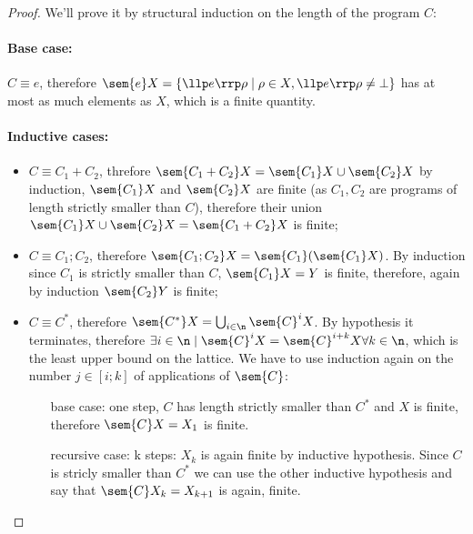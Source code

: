 \begin{proof}
  We'll prove it by structural induction on the length of the
  program \(C\):
  \paragraph*{Base case: \\}
  \(C \equiv e\), therefore \(\sem{e} X = \{\llp e \rrp \rho \mid \rho
  \in X , \llp e \rrp \rho \neq \bot\}\) has at most as much elements
  as \(X\), which is a finite quantity.
  \paragraph*{Inductive cases: \\}
  \begin{itemize}
  \item \(C \equiv C_1 + C_2\), threfore \(\sem{C_1 +C_2}X =
    \sem{C_1}X \cup \sem{C_2}X\) by induction, \(\sem{C_1}X\) and
    \(\sem{C_2}X\) are finite (as \(C_1, C_2\) are programs of length
    strictly smaller than \(C\)), therefore their union \(\sem{C_1}X
    \cup \sem{C_2}X = \sem{C_1 +C_2}X\) is finite;
  \item \(C \equiv C_1; C_2\), therefore \(\sem{C_1;C_2}X =
    \sem{C_1}(\sem{C_1}X)\). By induction since \(C_1\) is strictly
    smaller than \(C\), \(\sem{C_1}X = Y\) is finite, therefore, again
    by induction \(\sem{C_2}Y\) is finite;
  \item \(C \equiv C^*\), therefore \(\sem{C^*}X =
    \bigcup_{i\in\n}\sem{C}^iX\). By hypothesis it terminates,
    therefore \(\exists i \in \n \mid \sem{C}^iX = \sem{C}^{i+k}X
    \forall k \in \n\), which is the least upper bound on the
    lattice. We have to use induction again on the number \(j \in
    [i;k]\) of applications of \(\sem{C}\):
    \begin{itemize}
    \item[base case:] one step, \(C\) has length strictly smaller than
      \(C^*\) and \(X\) is finite, therefore \(\sem{C}X = X_1\) is finite.
    \item[recursive case:] k steps: \(X_k\) is again finite by
      inductive hypothesis. Since \(C\) is stricly smaller than
      \(C^*\) we can use the other inductive hypothesis and say that
      \(\sem{C}X_k = X_{k+1}\) is again, finite.
    \end{itemize}
  \end{itemize}
\end{proof}

